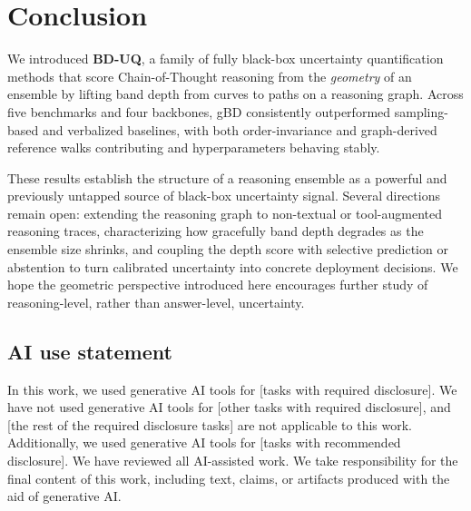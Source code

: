\documentclass[twoside]{article}
\begin{document}
\section{Conclusion}
\label{sec:conclusion}

We introduced \textbf{BD-UQ}, a family of fully black-box uncertainty
quantification methods that score Chain-of-Thought reasoning from the
\emph{geometry} of an ensemble by lifting band depth from curves to paths on a
reasoning graph. Across five benchmarks and four backbones, gBD consistently
outperformed sampling-based and verbalized baselines, with both order-invariance
and graph-derived reference walks contributing and hyperparameters behaving stably.

These results establish the structure of a reasoning ensemble as a powerful and
previously untapped source of black-box uncertainty signal. Several directions
remain open: extending the reasoning graph to non-textual or tool-augmented
reasoning traces, characterizing how gracefully band depth degrades as the
ensemble size shrinks, and coupling the depth score with selective prediction or
abstention to turn calibrated uncertainty into concrete deployment decisions. We
hope the geometric perspective introduced here encourages further study of
reasoning-level, rather than answer-level, uncertainty.

\subsection*{AI use statement}

In this work, we used generative AI tools for [tasks with required disclosure].
We have not used generative AI tools for [other tasks with required disclosure], and [the rest of the required
disclosure tasks] are not applicable to this work.
Additionally, we used generative AI tools for [tasks with recommended disclosure].
We have reviewed all AI-assisted work.
We take responsibility for the final content of this work, including text, claims, or artifacts produced with the
aid of generative AI.



\end{document}
